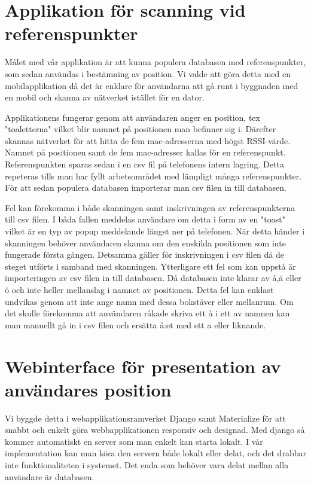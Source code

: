 \documentclass[swedish, a4paper,12pt]{article}
\begin{document}
\section{Applikation för scanning vid referenspunkter}
Målet med vår applikation är att kunna populera databasen med referenspunkter, som sedan användas i bestämning av position. Vi valde att göra detta med en mobilapplikation då det är enklare för användarna att gå runt i byggnaden med en mobil och skanna av nätverket istället för en dator.

Applikationens fungerar genom att användaren anger en position, tex "toaletterna" vilket blir namnet på positionen man befinner sig i. Därefter skannas nätverket för att hitta de fem mac-adresserna med högst RSSI-värde. Namnet på positionen samt de fem mac-adresser kallas för en referenspunkt. Referenspunkten sparas sedan i en csv fil på telefonens intern lagring. Detta repeteras tills man har fyllt arbetsområdet med lämpligt %
många referenspunkter. För att sedan populera databasen importerar man csv filen in till databasen.

Fel kan förekomma i både skanningen samt inskrivningen av referenspunkterna till csv filen. I båda fallen meddelas användare om detta i form av en "toast" vilket är en typ av popup meddelande längst ner på telefonen. När detta händer i skanningen behöver användaren skanna om den enskilda positionen som inte fungerade första gången. Detsamma gäller för inskrivningen i csv filen då de steget utförts i samband med skanningen. Ytterligare ett fel som kan uppstå är importeringen av csv filen in till databasen. Då databasen inte klarar av å,ä eller ö och inte heller mellanslag i namnet av positionen. Detta fel kan enklast undvikas genom att inte ange namn med dessa bokstäver eller mellanrum. Om det skulle förekomma att användaren råkade skriva ett å i ett av namnen kan man manuellt gå in i csv filen och ersätta å:et med ett a eller liknande.

\section{Webinterface för presentation av användares position}\label{webinterface}
Vi byggde detta i webapplikationsramverket Django samt Materialize%
för att snabbt och enkelt göra webbapplikationen responsiv och designad. Med django så kommer automatiskt en server som man enkelt kan starta lokalt. I vår implementation kan man köra den servern både lokalt eller delat, och det drabbar inte funktionaliteten i systemet. Det enda som behöver vara delat mellan alla användare är databasen.
\end{document}
